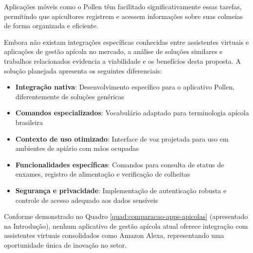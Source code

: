 Aplicações móveis como o Pollen têm facilitado significativamente essas tarefas, permitindo que apicultores registrem e acessem informações sobre suas colmeias de forma organizada e eficiente.


Embora não existam integrações específicas conhecidas entre assistentes virtuais e aplicações de gestão apícola no mercado, a análise de soluções similares e trabalhos relacionados evidencia a viabilidade e os benefícios desta proposta. A solução planejada apresenta os seguintes diferenciais:

\begin{itemize}
    \item \textbf{Integração nativa}: Desenvolvimento específico para o aplicativo Pollen, diferentemente de soluções genéricas
    \item \textbf{Comandos especializados}: Vocabulário adaptado para terminologia apícola brasileira
    \item \textbf{Contexto de uso otimizado}: Interface de voz projetada para uso em ambientes de apiário com mãos ocupadas
    \item \textbf{Funcionalidades específicas}: Comandos para consulta de status de enxames, registro de alimentação e verificação de colheitas
    \item \textbf{Segurança e privacidade}: Implementação de autenticação robusta e controle de acesso adequado aos dados sensíveis
\end{itemize}

Conforme demonstrado no Quadro \ref{quad:comparacao-apps-apicolas} (apresentado na Introdução), nenhum aplicativo de gestão apícola atual oferece integração com assistentes virtuais consolidados como Amazon Alexa, representando uma oportunidade única de inovação no setor.
















